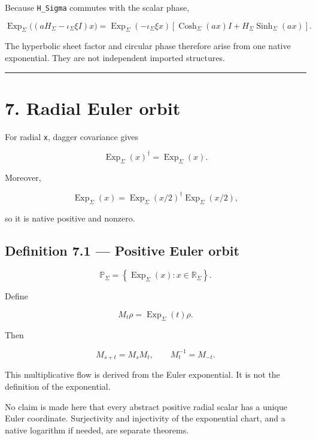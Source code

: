 Because \texttt{H\_Sigma} commutes with the scalar phase,

\[
\boxed{
\operatorname{Exp}_\Sigma
\bigl((aH_\Sigma-\iota_\Sigma\xi I)x\bigr)
=
\operatorname{Exp}_\Sigma(-\iota_\Sigma\xi x)
\left[
\operatorname{Cosh}_\Sigma(ax)I
+
H_\Sigma\operatorname{Sinh}_\Sigma(ax)
\right].
}
\]

The hyperbolic sheet factor and circular phase therefore arise from one native
exponential. They are not independent imported structures.

\begin{center}\rule{0.5\linewidth}{0.5pt}\end{center}

\hypertarget{radial-euler-orbit}{%
\section{7. Radial Euler orbit}\label{radial-euler-orbit}}

For radial \texttt{x}, dagger covariance gives

\[
\operatorname{Exp}_\Sigma(x)^\dagger
=
\operatorname{Exp}_\Sigma(x).
\]

Moreover,

\[
\operatorname{Exp}_\Sigma(x)
=
\operatorname{Exp}_\Sigma(x/2)^\dagger
\operatorname{Exp}_\Sigma(x/2),
\]

so it is native positive and nonzero.

\hypertarget{definition-7.1-positive-euler-orbit}{%
\subsection{Definition 7.1 --- Positive Euler orbit}\label{definition-7.1-positive-euler-orbit}}

\[
\mathbb P_\Sigma
=
\left\{
\operatorname{Exp}_\Sigma(x)
:
x\in\mathbb R_\Sigma
\right\}.
\]

Define

\[
M_t\rho
=
\operatorname{Exp}_\Sigma(t)\rho.
\]

Then

\[
M_{s+t}=M_sM_t,
\qquad
M_t^{-1}=M_{-t}.
\]

This multiplicative flow is derived from the Euler exponential. It is not the
definition of the exponential.

No claim is made here that every abstract positive radial scalar has a unique
Euler coordinate. Surjectivity and injectivity of the exponential chart, and a
native logarithm if needed, are separate theorems.

